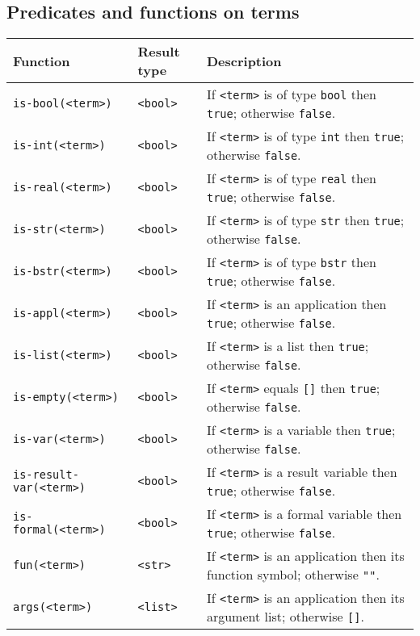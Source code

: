 \documentclass[a4,twoside,noweb]{article} %
\begin{document}
\subsection{Predicates and functions on terms}
\begin{tabular}{|l|l|p{8cm}|} \hline
 Function				& Result type 	& Description \\ \hline
 {\tt is-bool(<term>)}			& {\tt  <bool>} & If {\tt <term>} is of type {\tt bool} then {\tt true};
							  otherwise {\tt false}.\\
 {\tt is-int(<term>)}			& {\tt  <bool>} & If {\tt <term>} is of type {\tt int} then {\tt true};
							  otherwise {\tt false}.\\
 {\tt is-real(<term>)}			& {\tt  <bool>} & If {\tt <term>} is of type {\tt real} then {\tt true};
							  otherwise {\tt false}.\\
 {\tt is-str(<term>)}			& {\tt  <bool>} & If {\tt <term>} is of type {\tt str} then {\tt true};
							  otherwise {\tt false}.\\
 {\tt is-bstr(<term>)}			& {\tt  <bool>} & If {\tt <term>} is of type {\tt bstr} then {\tt true};
							  otherwise {\tt false}.\\
 {\tt is-appl(<term>)}			& {\tt  <bool>} & If {\tt <term>} is an application then {\tt true};
							  otherwise {\tt false}.\\
 {\tt is-list(<term>)}			& {\tt  <bool>} & If {\tt <term>} is a list then {\tt true};
							  otherwise {\tt false}.\\
 {\tt is-empty(<term>)}			& {\tt  <bool>} & If {\tt <term>} equals {\tt []} then {\tt true};
							  otherwise {\tt false}.\\
 {\tt is-var(<term>)}			& {\tt  <bool>} & If {\tt <term>} is a variable then {\tt true};
							  otherwise {\tt false}.\\
 {\tt is-result-var(<term>)}		& {\tt  <bool>} & If {\tt <term>} is a result variable then {\tt true};
							  otherwise {\tt false}.\\
 {\tt is-formal(<term>)}		& {\tt  <bool>} & If {\tt <term>} is a formal variable then {\tt true};
							  otherwise {\tt false}.\\
 {\tt fun(<term>)}			& {\tt  <str>} & If {\tt <term>} is an application then its function symbol;
							  otherwise {\tt ""}.\\
 {\tt args(<term>)}			& {\tt  <list>} & If {\tt <term>} is an application then its argument list;
							  otherwise {\tt []}.\\ \hline
\end{tabular}
\end{document}

